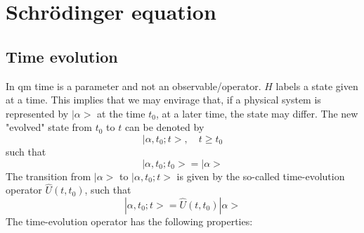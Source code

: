 \section{Schrödinger equation}
\subsection{Time evolution}
In qm time is a parameter and not an observable/operator.
$H$ labels a state given at a time. This implies that we may
envirage that, if a physical system is represented by
$|\alpha>$ at the time $t_0$, at a later time, the state may
differ. The new "evolved" state from $t_0$ to $t$ can be
denoted by
$$
|\alpha,t_0;t>, \quad t \geq t_0
$$
such that
$$
|\alpha,t_0;t_0> = |\alpha>
$$
The transition from $|\alpha>$ to $|\alpha,t_0;t>$ is given
by the so-called time-evolution operator $\hat{U}(t,t_0)$,
such that
\begin{equation}
  |\alpha,t_0;t> = \hat{U}(t,t_0) |\alpha>
  \label{equ:2.1}
\end{equation}
The time-evolution operator has the following properties:
